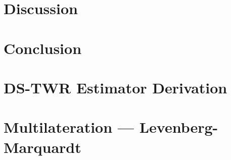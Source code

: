\documentclass[letterpaper, 10pt, conference]{IEEEtran}
\begin{document}
\section{Discussion}
\label{sec:discussion}


\section{Conclusion}
\label{sec:conclusion}





\appendix
\section{DS-TWR Estimator Derivation}


\section{Multilateration — Levenberg-Marquardt}

\end{document}
